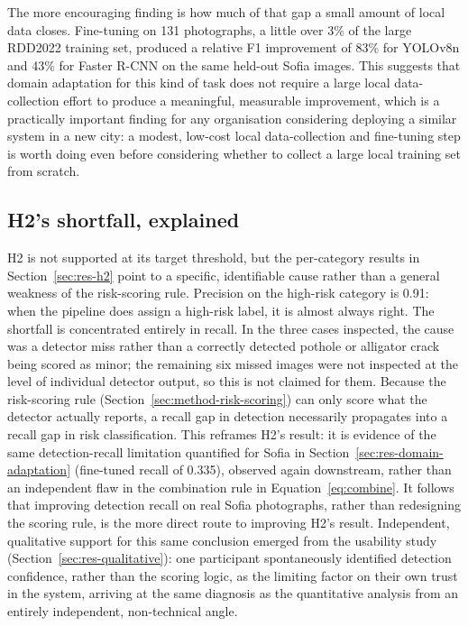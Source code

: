 \documentclass[10pt,a4paper,twocolumn]{article}
\begin{document}
The more encouraging finding is how much of that gap a small amount of
local data closes. Fine-tuning on 131 photographs, a little over 3\% of
the large RDD2022 training set, produced a relative F1 improvement of
83\% for YOLOv8n and 43\% for Faster R-CNN on the same held-out Sofia
images. This suggests that domain adaptation for this kind of task does
not require a large local data-collection effort to produce a
meaningful, measurable improvement, which is a practically important
finding for any organisation considering deploying a similar system in a
new city: a modest, low-cost local data-collection and fine-tuning step
is worth doing even before considering whether to collect a large local
training set from scratch.

\subsection{H2's shortfall, explained}
\label{sec:disc-h2}

H2 is not supported at its target threshold, but the per-category
results in Section~\ref{sec:res-h2} point to a specific, identifiable
cause rather than a general weakness of the risk-scoring rule. Precision
on the high-risk category is 0.91: when the pipeline does assign a
high-risk label, it is almost always right. The shortfall is
concentrated entirely in recall. In the three cases inspected, the cause was
a detector miss rather than a correctly detected pothole or alligator crack
being scored as minor; the remaining six missed images were not inspected at
the level of individual detector output, so this is not claimed for them. Because the
risk-scoring rule (Section~\ref{sec:method-risk-scoring}) can only score
what the detector actually reports, a recall gap in detection
necessarily propagates into a recall gap in risk classification. This
reframes H2's result: it is evidence of the same detection-recall
limitation quantified for Sofia in
Section~\ref{sec:res-domain-adaptation} (fine-tuned recall of 0.335),
observed again downstream, rather than an independent flaw in the
combination rule in Equation~\ref{eq:combine}. It follows that improving
detection recall on real Sofia photographs, rather than redesigning the
scoring rule, is the more direct route to improving H2's result.
Independent, qualitative support for this same conclusion emerged from
the usability study (Section~\ref{sec:res-qualitative}): one participant
spontaneously identified detection confidence, rather than the scoring logic, as the
limiting factor on their own trust in the system, arriving at the same
diagnosis as the quantitative analysis from an entirely independent,
non-technical angle.
\end{document}
